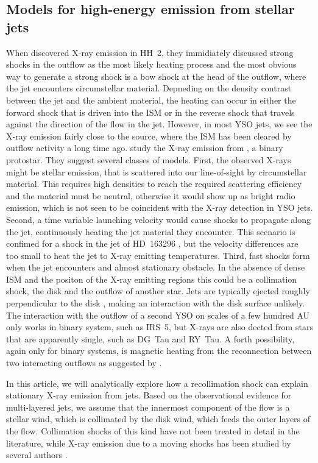 \subsection{Models for high-energy emission from stellar jets}
\label{sect:intromodel}
When \citet{2001Natur.413..708P} discovered X-ray emission in HH~2, they immidiately discussed strong shocks in the outflow as the most likely heating process and the most obvious way to generate a strong shock is a bow shock at the head of the outflow, where the jet encounters circumstellar material. Depneding on the density contrast between the jet and the ambient material, the heating can occur in either the forward shock that is driven into the ISM or in the reverse shock that travels against the direction of the flow in the jet. However, in most YSO jets, we see the X-ray emission fairly close to the source, where the ISM has been cleared by outflow activity a long time ago. \citet{2003ApJ...584..843B} study the X-ray emission from , a binary protostar. They suggest several classes of models. First, the observed X-rays might be stellar emission, that is scattered into our line-of-sight by circumstellar material. This requires high densities to reach the required scattering efficiency and the material must be neutral, otherwise it would show up as bright radio emission, which is not seen to be coincident with the X-ray detection in YSO jets. Second, a time variable launching velocity would cause shocks to propagate along the jet, continuously heating the jet material they encounter. This scenario is confimed for a shock in the jet of HD~163296 \citep{2013A&A...552A.142G}, but the velocity differences are too small to heat the jet to X-ray emitting temperatures. Third, fast shocks form when the jet encounters and almost stationary obstacle. In the absence of dense ISM and the positon of the X-ray emitting regions this could be a collimation shock, the disk and the outflow of another star. Jets are typically ejected roughly perpendicular to the disk \citep[e.g.][for IRS 5]{2002A&A...382..573F}, making an interaction with the disk surface unlikely. The interaction with the outflow of a second YSO on scales of a few hundred AU only works in binary system, such as IRS~5, but X-rays are also dected from stars that are apparently single, such as DG~Tau and RY~Tau. A forth possibility, again only for binary systems, is magnetic heating from the reconnection between two interacting outflows as suggested by \citet{2008A&A...478..453M}.

In this article, we will analytically explore how a recollimation shock can explain stationary X-ray emission from jets. Based on the observational evidence for multi-layered jets, we assume that the innermost component of the flow is a stellar wind, which is collimated by the disk wind, which feeds the outer layers of the flow. Collimation shocks of this kind have not been treated in detail in the literature, while X-ray emission due to a moving shocks has been studied by several authors \citep[see, e.g.\ the analytical work and numerical simulations by][]{http://adsabs.harvard.edu/abs/2002ApJ...576L.149R,http://adsabs.harvard.edu/abs/2007A&A...462..645B,http://adsabs.harvard.edu/abs/2010A&A...517A..68B}.

